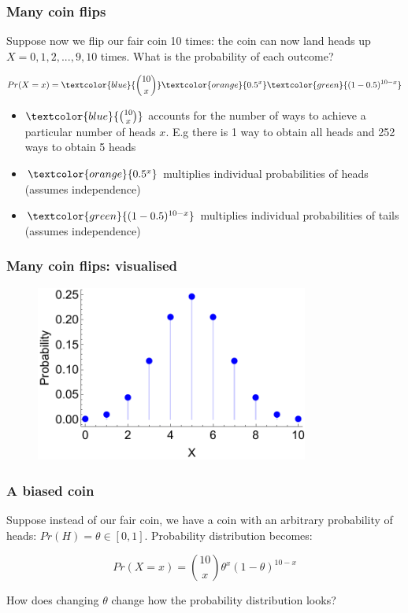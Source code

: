 \documentclass{beamer}
\begin{document}
	\begin{frame}
		\frametitle{Many coin flips}
		
		Suppose now we flip our fair coin 10 times: the coin can now land heads up $X=0, 1, 2, ..., 9, 10$ times. What is the probability of each outcome?
		
		\begin{equation}
		Pr(X=x) = \textcolor{blue}{\binom{10}{x}} \textcolor{orange}{0.5^x} \textcolor{green}{(1 - 0.5)^{10-x}}
		\end{equation}
		
		\begin{itemize}
			\item $\textcolor{blue}{\binom{10}{x}}$ accounts for the number of ways to achieve a particular number of heads $x$. E.g there is 1 way to obtain all heads and 252 ways to obtain 5 heads
			\item $\textcolor{orange}{0.5^x}$ multiplies individual probabilities of heads (assumes independence)
			\item $\textcolor{green}{(1 - 0.5)^{10-x}}$ multiplies individual probabilities of tails (assumes independence)
		\end{itemize}
		
	\end{frame}
	
	\begin{frame}
		\frametitle{Many coin flips: visualised}
		
		\begin{figure}[ht]
			\includegraphics[width=0.8\textwidth]{./figures/binomial_10.pdf}
		\end{figure}
		
	\end{frame}
	
	\begin{frame}
		\frametitle{A biased coin}
		
		Suppose instead of our fair coin, we have a coin with an arbitrary probability of heads: $Pr(H) = \theta\in [0, 1]$. Probability distribution becomes:
		
		\begin{equation}
		Pr(X=x) = \binom{10}{x} \theta^x (1 - \theta)^{10 - x}
		\end{equation}
		
		How does changing $\theta$ change how the probability distribution looks?
		
	\end{frame}
	
\end{document}

